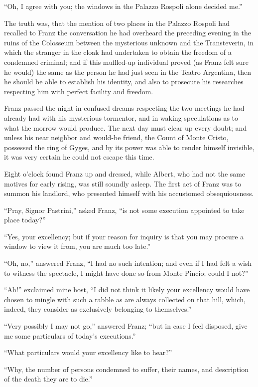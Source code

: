 “Oh, I agree with you; the windows in the Palazzo Rospoli alone decided
me.”

The truth was, that the mention of two places in the Palazzo Rospoli
had recalled to Franz the conversation he had overheard the preceding
evening in the ruins of the Colosseum between the mysterious unknown
and the Transteverin, in which the stranger in the cloak had undertaken
to obtain the freedom of a condemned criminal; and if this muffled-up
individual proved (as Franz felt sure he would) the same as the person
he had just seen in the Teatro Argentina, then he should be able to
establish his identity, and also to prosecute his researches respecting
him with perfect facility and freedom.

Franz passed the night in confused dreams respecting the two meetings
he had already had with his mysterious tormentor, and in waking
speculations as to what the morrow would produce. The next day must
clear up every doubt; and unless his near neighbor and would-be friend,
the Count of Monte Cristo, possessed the ring of Gyges, and by its
power was able to render himself invisible, it was very certain he
could not escape this time.

Eight o’clock found Franz up and dressed, while Albert, who had not the
same motives for early rising, was still soundly asleep. The first act
of Franz was to summon his landlord, who presented himself with his
accustomed obsequiousness.

“Pray, Signor Pastrini,” asked Franz, “is not some execution appointed
to take place today?”

“Yes, your excellency; but if your reason for inquiry is that you may
procure a window to view it from, you are much too late.”

“Oh, no,” answered Franz, “I had no such intention; and even if I had
felt a wish to witness the spectacle, I might have done so from Monte
Pincio; could I not?”

“Ah!” exclaimed mine host, “I did not think it likely your excellency
would have chosen to mingle with such a rabble as are always collected
on that hill, which, indeed, they consider as exclusively belonging to
themselves.”

“Very possibly I may not go,” answered Franz; “but in case I feel
disposed, give me some particulars of today’s executions.”

“What particulars would your excellency like to hear?”

“Why, the number of persons condemned to suffer, their names, and
description of the death they are to die.”

